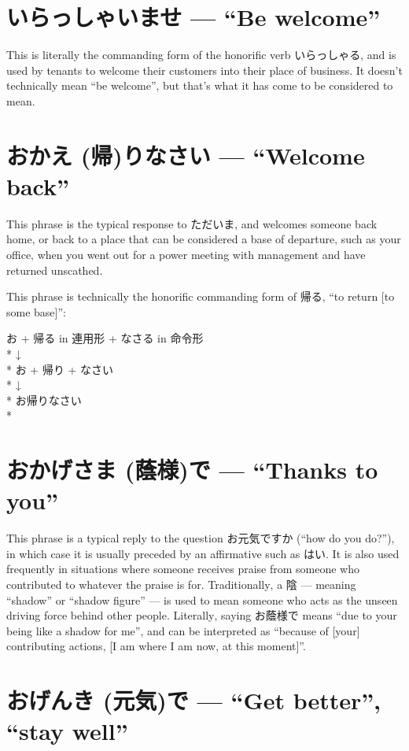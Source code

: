 \documentclass[11pt, b5paper, twoside, openright, onecolumn]{book}
\makeatletter
\newcommand*{\rubystack}[2]{{\relscale{0.5}%
  \begin{tabular}[b]{@{}c@{}}%
    {#1}\\%
   {\textscale{2}{#2}}%
  \end{tabular}}%
}
\DeclareRobustCommand*{\ruby}[2]{%
  \mbox{%
    \setlength{\parskip}{0ex}%
    \BeginAccSupp{method=pdfstringdef,ActualText={#1}}%
      \rubystack{\phantom{#2}}{#1}%
      \llap{%
        \rubystack{#2}{\phantom{#1}}%
      }%
    \EndAccSupp{}%
  }%
}
\renewcommand*{\ruby}[2]{#2 (#1)}%
\newenvironment{exampleblock}{
\setlength{\parindent}{0.6in}
\begin{minipage}[t]{\dimexpr\textwidth-\parindent}}
{\end{minipage}}
\makeatother
\begin{document}
\section*{いらっしゃいませ — “Be welcome”}

This is literally the commanding form of the honorific verb いらっしゃる‚ and is used by tenants to welcome their customers into their place of business. It doesn’t technically mean “be welcome”‚ but that’s what it has come to be considered to mean.

\section*{お\ruby{帰}{かえ}りなさい — “Welcome back”}

This phrase is the typical response to ただいま‚ and welcomes someone back home‚ or back to a place that can be considered a base of departure‚ such as your office‚ when you went out for a power meeting with management and have returned unscathed.

This phrase is technically the honorific commanding form of 帰る‚ “to return [to some base]”:

\vspace{0.4cm}
\begin{exampleblock}
お + 帰る in 連用形 + なさる in 命令形 \\* 
↓ \\* 
お + 帰り + なさい \\* 
↓ \\* 
お帰りなさい \\* 
\end{exampleblock}
\section*{お\ruby{蔭様}{かげさま}で — “Thanks to you”}


This phrase is a typical reply to the question お元気ですか (“how do you do?”)‚ in which case it is usually preceded by an affirmative such as はい. It is also used frequently in situations where someone receives praise from someone who contributed to whatever the praise is for. Traditionally‚ a 陰 — meaning “shadow” or “shadow figure” — is used to mean someone who acts as the unseen driving force behind other people. Literally‚ saying お蔭様で means “due to your being like a shadow for me”‚ and can be interpreted as “because of [your] contributing actions‚ [I am where I am now‚ at this moment]”.

\section*{お\ruby{元気}{げんき}で — “Get better”‚ “stay well”}
\end{document}
